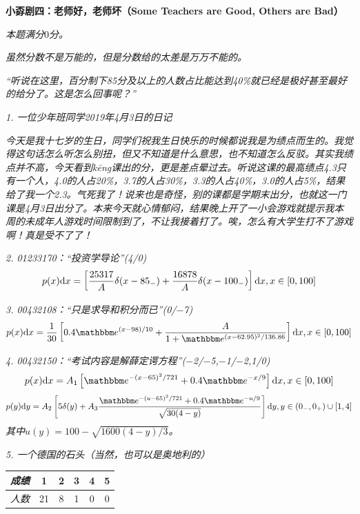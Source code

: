 \documentclass[11pt,a4paper,onecolumn,UTF8]{ctexart}
\begin{document}
	
	
	
	
	
	
	
	
	
	
	
	
	
	
	
	
	
	
	\newpage
	\noindent
	\textbf{小孬剧四：老师好，老师坏（Some Teachers are Good, Others are Bad）}
	
	\textit{本题满分$0$分。}
	
	\textit{虽然分数不是万能的，但是分数给的太差是万万不能的。}
	
	\textit{“听说在这里，百分制下85分及以上的人数占比能达到40\%就已经是极好甚至最好的给分了。这是怎么回事呢？”}

	\textit{1. 一位少年班同学2019年4月3日的日记}
	
	\textit{今天是我十七岁的生日，同学们祝我生日快乐的时候都说我是为绩点而生的。我觉得这句话怎么听怎么别扭，但又不知道是什么意思，也不知道怎么反驳。其实我绩点并不高，今天看到k\=eng课出的分，更是差点晕过去。听说这课的最高绩点4.3只有一个人，4.0的人占20\%，3.7的人占30\%，3.3的人占40\%，3.0的人占5\%，结果给了我一个2.3。气死我了！说来也是奇怪，别的课都是学期末出分，也就这一门课是4月3日出分了。本来今天就心情郁闷，结果晚上开了一小会游戏就提示我本周的未成年人游戏时间限制到了，不让我接着打了。唉，怎么有大学生打不了游戏啊！真是受不了了！}
	
	\textit{2. 01233170：“投资学导论”(4/0)}
	$$p(x)\mathrm{d} x=\left[\frac{25317}{A}\delta(x-85_-)+\frac{16878}{A}\delta(x-100_-)\right]\mathrm{d} x, x\in\left[0,100\right]$$
	
	\textit{3. 00432108：“只是求导和积分而已”(0/$-$7)}
	$$p(x)\ud x=\frac{1}{30}\left[0.4\ue^{(x-98)/10}+\frac{A}{1+\ue^{(x-62.95)^2/136.86}}\right]\ud x, x\in[0,100]$$
	
	\textit{4. 00432150：“考试内容是解薛定谔方程”($-$2/$-$5,$-$1/$-$2,1/0)}
	$$p(x)\ud x=A_1\left[\ue^{-(x-65)^2/721}+0.4\ue^{-x/9}\right]\ud x, x\in[0,100]$$
	$$p(y)\ud y=A_2\left[5\delta(y)+A_3\frac{\ue^{-(u-65)^2/721}+0.4\ue^{-u/9}}{\sqrt{30(4-y)}}\right]\ud y, y\in(0_-,0_+)\cup[1,4]$$
	\textit{其中$u(y)=100-\sqrt{1600(4-y)/3}$。}
	
	\textit{5. 一个德国的石头（当然，也可以是奥地利的）}
	
	\begin{table}[!h]
		\centering
		\begin{tabular}{|c|ccccc|}
			\hline
			\textit{成绩}&1&2&3&4&5 \\
			\hline
			\textit{人数}&21&8&1&0&0 \\
			\hline
		\end{tabular}
	\end{table}
	
\end{document}
